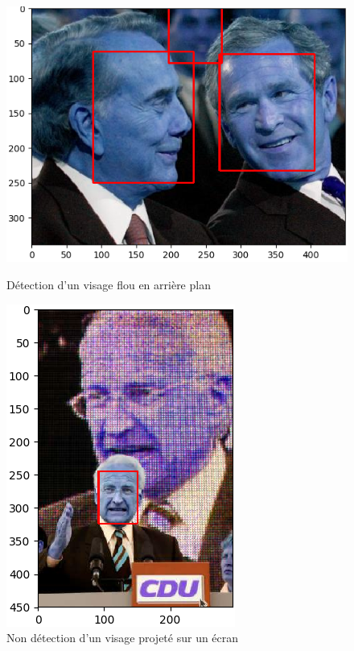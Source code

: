 \documentclass[a4paper,11pt]{article}
\begin{document}
	    \begin{figure}[H]
	        \centering
	        \begin{minipage}[c]{0.58\linewidth}
	            \begin{center}
	                \includegraphics[scale=0.45]{facenetTP1.png}
	                \caption{Détection d'un visage flou en arrière plan}
	            \end{center}
	        \end{minipage} \hfill
	        \begin{minipage}[c]{0.35\linewidth}
	            \begin{center}
	                \includegraphics[scale=0.45]{facenetTP2.png}
	                \caption{Non détection d'un visage projeté sur un écran}
	                \label{fig:proj_ecran}
	            \end{center}
	        \end{minipage}
	    \end{figure}
	    
\end{document}
